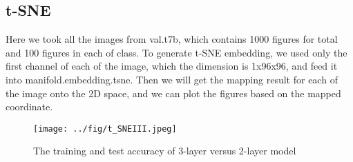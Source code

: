 \documentclass[final]{siamltexmm}
\begin{document}
\subsection{t-SNE}
Here we took all the images from val.t7b, which contains 1000 figures for total and 100 figures in each of class. To generate t-SNE embedding, we used only the first channel of each of the image, which the dimension is 1x96x96, and feed it into manifold.embedding.tsne. Then we will get the mapping result for each of the image onto the 2D space, and we can plot the figures based on the mapped coordinate.

\begin{figure}[H]
  \centering
    \texttt{[image: ../fig/t\_SNEIII.jpeg]}
  \caption{The training and test accuracy of 3-layer versus 2-layer model}
\end{figure}
\end{document}
